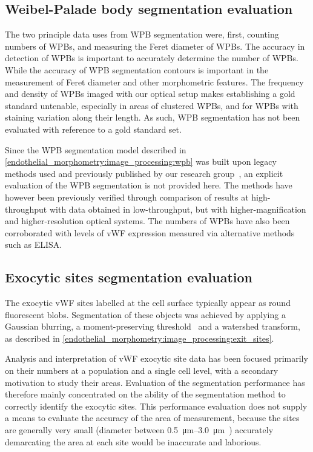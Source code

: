 \subsection{Weibel-Palade body segmentation evaluation}
\label{endothelial_morphometry:performance_evaluation:WPB}
The two principle data uses from WPB segmentation were, first, counting numbers of WPBs, and measuring the Feret diameter of WPBs. The accuracy in detection of WPBs is important to accurately determine the number of WPBs. While the accuracy of WPB segmentation contours is important in the measurement of Feret diameter and other morphometric features. The frequency and density of WPBs imaged with our optical setup makes establishing a gold standard untenable, especially in areas of clustered WPBs, and for WPBs with staining variation along their length. As such, WPB segmentation has not been evaluated with reference to a gold standard set.

Since the WPB segmentation model described in \autoref{endothelial_morphometry:image_processing:wpb} was built upon legacy methods used and previously published by our research group~\cite{Ferraro2014,Stevenson2014}, an explicit evaluation of the WPB segmentation is not provided here. The methods have however been previously verified through comparison of results at high-throughput with data obtained in low-throughput, but with higher-magnification and higher-resolution optical systems. The numbers of WPBs have also been corroborated with levels of vWF expression measured via alternative methods such as ELISA.

\subsection{Exocytic sites segmentation evaluation}
\label{endothelial_morphometry:performance_evaluation:exit_sites}
The exocytic vWF sites labelled at the cell surface typically appear as round fluorescent blobs. Segmentation of these objects was achieved by applying a Gaussian blurring, a moment-preserving threshold~\cite{Tsai1985} and a watershed transform, as described in \autoref{endothelial_morphometry:image_processing:exit_sites}.

Analysis and interpretation of vWF exocytic site data has been focused primarily on their numbers at a population and a single cell level, with a secondary motivation to study their areas. Evaluation of the segmentation performance has therefore mainly concentrated on the ability of the segmentation method to correctly identify the exocytic sites. This performance evaluation does not supply a means to evaluate the accuracy of the area of measurement, because the sites are generally very small (diameter between \SIrange{0.5}{3.0}{\micro\meter}~\cite{Valentijn2010}) accurately demarcating the area at each site would be inaccurate and laborious.

